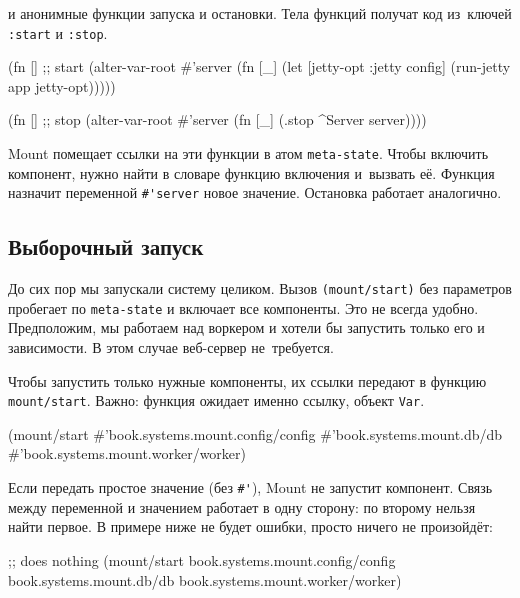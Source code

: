 \noindent
и анонимные функции запуска и остановки. Тела функций получат код из~ключей
\verb|:start| и \verb|:stop|.

\begin{english}
  \begin{clojure}
(fn [] ;; start
  (alter-var-root #'server
   (fn [_]
     (let [{jetty-opt :jetty} config]
       (run-jetty app jetty-opt)))))

(fn [] ;; stop
  (alter-var-root #'server
   (fn [_]
     (.stop ^Server server))))
  \end{clojure}
\end{english}

Mount помещает ссылки на эти функции в атом \verb|meta-state|. Чтобы включить
компонент, нужно найти в словаре функцию включения и~вызвать её. Функция
назначит переменной \verb|#'server| новое значение. Остановка работает
аналогично.

\subsection{Выборочный запуск}

\label{mount-selective}

До сих пор мы запускали систему целиком. Вызов \verb|(mount/start)| без
параметров пробегает по \verb|meta-state| и включает все компоненты. Это не
всегда удобно. Предположим, мы работаем над воркером и хотели бы запустить
только его и зависимости. В этом случае веб-сервер не~требуется.

Чтобы запустить только нужные компоненты, их ссылки передают в функцию
\verb|mount/start|. Важно: функция ожидает именно ссылку, объект \verb|Var|.

\begin{english}
  \begin{clojure}
(mount/start
  #'book.systems.mount.config/config
  #'book.systems.mount.db/db
  #'book.systems.mount.worker/worker)
  \end{clojure}
\end{english}

Если передать простое значение (без \verb|#'|), Mount не запустит
компонент. Связь между переменной и значением работает в одну сторону: по
второму нельзя найти первое. В примере ниже не будет ошибки, просто ничего не
произойдёт:

\begin{english}
  \begin{clojure}
;; does nothing
(mount/start
  book.systems.mount.config/config
  book.systems.mount.db/db
  book.systems.mount.worker/worker)
  \end{clojure}
\end{english}

